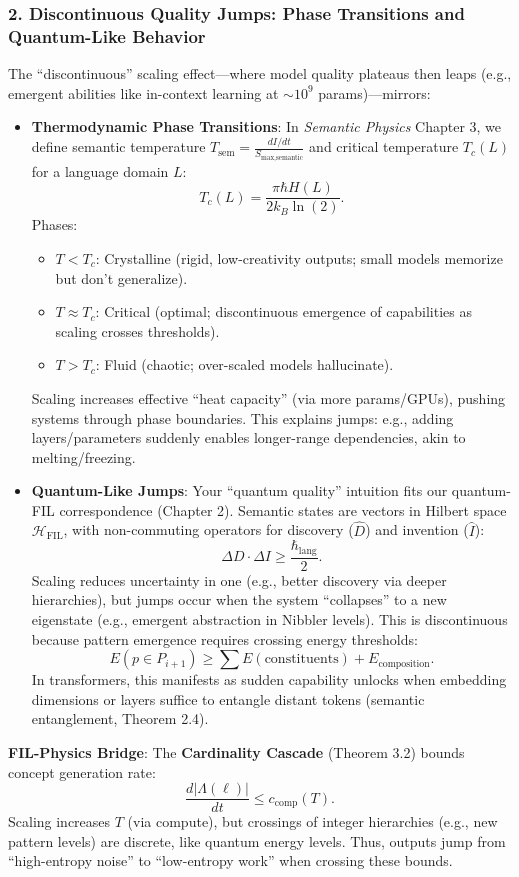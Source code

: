 \documentclass[11pt,letterpaper]{article}
\begin{document}
\subsubsection*{2. Discontinuous Quality Jumps: Phase Transitions and Quantum-Like Behavior}
The “discontinuous” scaling effect—where model quality plateaus then leaps (e.g., emergent abilities like in-context learning at $\sim 10^9$ params)—mirrors:
\begin{itemize}
    \item \textbf{Thermodynamic Phase Transitions}: In \emph{Semantic Physics} Chapter 3, we define semantic temperature $T_{\text{sem}} = \frac{dI/dt}{S_{\text{max,semantic}}}$ and critical temperature $T_c(L)$ for a language domain $L$:
    \[
    T_c(L) = \frac{\pi \hbar H(L)}{2 k_B \ln(2)}.
    \]
    Phases:
    \begin{itemize}
        \item $T < T_c$: Crystalline (rigid, low-creativity outputs; small models memorize but don’t generalize).
        \item $T \approx T_c$: Critical (optimal; discontinuous emergence of capabilities as scaling crosses thresholds).
        \item $T > T_c$: Fluid (chaotic; over-scaled models hallucinate).
    \end{itemize}
    Scaling increases effective “heat capacity” (via more params/GPUs), pushing systems through phase boundaries. This explains jumps: e.g., adding layers/parameters suddenly enables longer-range dependencies, akin to melting/freezing.
    \item \textbf{Quantum-Like Jumps}: Your “quantum quality” intuition fits our quantum-FIL correspondence (Chapter 2). Semantic states are vectors in Hilbert space $\mathcal{H}_{\text{FIL}}$, with non-commuting operators for discovery ($\hat{D}$) and invention ($\hat{I}$):
    \[
    \Delta D \cdot \Delta I \geq \frac{\hbar_{\text{lang}}}{2}.
    \]
    Scaling reduces uncertainty in one (e.g., better discovery via deeper hierarchies), but jumps occur when the system “collapses” to a new eigenstate (e.g., emergent abstraction in Nibbler levels). This is discontinuous because pattern emergence requires crossing energy thresholds:
    \[
    E(p \in P_{i+1}) \geq \sum E(\text{constituents}) + E_{\text{composition}}.
    \]
    In transformers, this manifests as sudden capability unlocks when embedding dimensions or layers suffice to entangle distant tokens (semantic entanglement, Theorem 2.4).
\end{itemize}
\textbf{FIL-Physics Bridge}: The \textbf{Cardinality Cascade} (Theorem 3.2) bounds concept generation rate:
\[
\frac{d|\Lambda(\ell)|}{dt} \leq c_{\text{comp}}(T).
\]
Scaling increases $T$ (via compute), but crossings of integer hierarchies (e.g., new pattern levels) are discrete, like quantum energy levels. Thus, outputs jump from “high-entropy noise” to “low-entropy work” when crossing these bounds.
\end{document}
